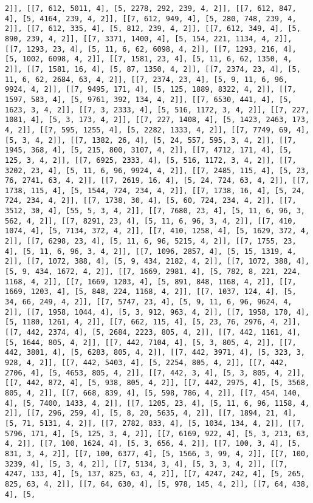 \documentclass[12pt,fleqn]{article}\usepackage{../../common}
\begin{document}
\begin{verbatim}
2]], [[7, 612, 5011, 4], [5, 2278, 292, 239, 4, 2]], [[7, 612, 847, 4], [5, 4164, 239, 4, 2]], [[7, 612, 949, 4], [5, 280, 748, 239, 4, 2]], [[7, 612, 335, 4], [5, 812, 239, 4, 2]], [[7, 612, 349, 4], [5, 890, 239, 4, 2]], [[7, 3371, 1400, 4], [5, 154, 221, 1134, 4, 2]], [[7, 1293, 23, 4], [5, 11, 6, 62, 6098, 4, 2]], [[7, 1293, 216, 4], [5, 1002, 6098, 4, 2]], [[7, 1581, 23, 4], [5, 11, 6, 62, 1350, 4, 2]], [[7, 1581, 16, 4], [5, 87, 1350, 4, 2]], [[7, 2374, 23, 4], [5, 11, 6, 62, 2684, 63, 4, 2]], [[7, 2374, 23, 4], [5, 9, 11, 6, 96, 9924, 4, 2]], [[7, 9495, 171, 4], [5, 125, 1889, 8322, 4, 2]], [[7, 1597, 583, 4], [5, 9761, 392, 134, 4, 2]], [[7, 6530, 441, 4], [5, 1623, 3, 4, 2]], [[7, 3, 2333, 4], [5, 516, 1172, 3, 4, 2]], [[7, 227, 1081, 4], [5, 3, 173, 4, 2]], [[7, 227, 1408, 4], [5, 1423, 2463, 173, 4, 2]], [[7, 595, 1255, 4], [5, 2282, 1333, 4, 2]], [[7, 7749, 69, 4], [5, 3, 4, 2]], [[7, 1382, 26, 4], [5, 24, 557, 595, 3, 4, 2]], [[7, 1945, 368, 4], [5, 215, 800, 3107, 4, 2]], [[7, 4712, 171, 4], [5, 125, 3, 4, 2]], [[7, 6925, 2333, 4], [5, 516, 1172, 3, 4, 2]], [[7, 3202, 23, 4], [5, 11, 6, 96, 9924, 4, 2]], [[7, 2485, 115, 4], [5, 23, 76, 2741, 63, 4, 2]], [[7, 2619, 16, 4], [5, 24, 724, 63, 4, 2]], [[7, 1738, 115, 4], [5, 1544, 724, 234, 4, 2]], [[7, 1738, 16, 4], [5, 24, 724, 234, 4, 2]], [[7, 1738, 30, 4], [5, 60, 724, 234, 4, 2]], [[7, 3512, 30, 4], [55, 5, 3, 4, 2]], [[7, 7680, 23, 4], [5, 11, 6, 96, 3, 562, 4, 2]], [[7, 8291, 23, 4], [5, 11, 6, 96, 3, 4, 2]], [[7, 410, 1074, 4], [5, 7134, 372, 4, 2]], [[7, 410, 1258, 4], [5, 1629, 372, 4, 2]], [[7, 6298, 23, 4], [5, 11, 6, 96, 5215, 4, 2]], [[7, 1755, 23, 4], [5, 11, 6, 96, 3, 4, 2]], [[7, 1096, 2857, 4], [5, 15, 1319, 4, 2]], [[7, 1072, 388, 4], [5, 9, 434, 2182, 4, 2]], [[7, 1072, 388, 4], [5, 9, 434, 1672, 4, 2]], [[7, 1669, 2981, 4], [5, 782, 8, 221, 224, 1168, 4, 2]], [[7, 1669, 1203, 4], [5, 891, 848, 1168, 4, 2]], [[7, 1669, 1203, 4], [5, 848, 224, 1168, 4, 2]], [[7, 1037, 124, 4], [5, 34, 66, 249, 4, 2]], [[7, 5747, 23, 4], [5, 9, 11, 6, 96, 9624, 4, 2]], [[7, 1958, 1044, 4], [5, 3, 912, 963, 4, 2]], [[7, 1958, 170, 4], [5, 1180, 1261, 4, 2]], [[7, 662, 115, 4], [5, 23, 76, 2976, 4, 2]], [[7, 442, 2374, 4], [5, 2684, 2223, 805, 4, 2]], [[7, 442, 1161, 4], [5, 1644, 805, 4, 2]], [[7, 442, 7104, 4], [5, 3, 805, 4, 2]], [[7, 442, 3801, 4], [5, 6283, 805, 4, 2]], [[7, 442, 3971, 4], [5, 323, 3, 928, 4, 2]], [[7, 442, 5403, 4], [5, 2254, 805, 4, 2]], [[7, 442, 2706, 4], [5, 4653, 805, 4, 2]], [[7, 442, 3, 4], [5, 3, 805, 4, 2]], [[7, 442, 872, 4], [5, 938, 805, 4, 2]], [[7, 442, 2975, 4], [5, 3568, 805, 4, 2]], [[7, 668, 839, 4], [5, 598, 786, 4, 2]], [[7, 454, 140, 4], [5, 7400, 1433, 4, 2]], [[7, 1205, 23, 4], [5, 11, 6, 96, 1158, 4, 2]], [[7, 296, 259, 4], [5, 8, 20, 5635, 4, 2]], [[7, 1894, 21, 4], [5, 71, 5131, 4, 2]], [[7, 2782, 833, 4], [5, 1034, 134, 4, 2]], [[7, 5796, 171, 4], [5, 125, 3, 4, 2]], [[7, 6169, 922, 4], [5, 3, 213, 63, 4, 2]], [[7, 100, 1624, 4], [5, 3, 656, 4, 2]], [[7, 100, 3, 4], [5, 831, 3, 4, 2]], [[7, 100, 6377, 4], [5, 1566, 3, 99, 4, 2]], [[7, 100, 3239, 4], [5, 3, 4, 2]], [[7, 5134, 3, 4], [5, 3, 3, 4, 2]], [[7, 4247, 133, 4], [5, 137, 825, 63, 4, 2]], [[7, 4247, 242, 4], [5, 265, 825, 63, 4, 2]], [[7, 64, 630, 4], [5, 978, 145, 4, 2]], [[7, 64, 438, 4], [5, 
\end{verbatim}
\end{document}
